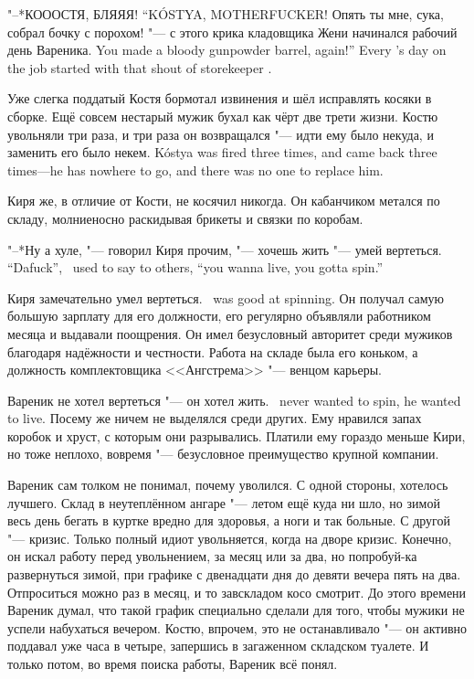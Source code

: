 {"--*КОООСТЯ, БЛЯЯЯ!}
{``K\'OSTYA, MOTHERFUCKER!}
{Опять ты мне, сука, собрал бочку с порохом! "--- с этого крика кладовщика Жени начинался рабочий день Вареника.}
{You made a bloody gunpowder barrel, again!'' Every \Varenik's day on the job started with that shout of storekeeper \Zhenya.}

Уже слегка поддатый Костя бормотал извинения и шёл исправлять косяки в сборке.
Ещё совсем нестарый мужик бухал как чёрт две трети жизни.
{Костю увольняли три раза, и три раза он возвращался "--- идти ему было некуда, и заменить его было некем.}
{K\'ostya was fired three times, and came back three times---he has nowhere to go, and there was no one to replace him.}

Киря же, в отличие от Кости, не косячил никогда.
Он кабанчиком метался по складу, молниеносно раскидывая брикеты и связки по коробам.

{"--*Ну а хуле, "--- говорил Киря прочим, "--- хочешь жить "--- умей вертеться.}
{``Dafuck'', \Kirya\ used to say to others, ``you wanna live, you gotta spin.''}

{Киря замечательно умел вертеться.}
{\Kirya\ was good at spinning.}
Он получал самую большую зарплату для его должности, его регулярно объявляли работником месяца и выдавали поощрения.
Он имел безусловный авторитет среди мужиков благодаря надёжности и честности.
Работа на складе была его коньком, а должность комплектовщика <<Ангстрема>> "--- венцом карьеры.

{Вареник не хотел вертеться "--- он хотел жить.}
{\Varenik\ never wanted to spin, he wanted to live.}
Посему же ничем не выделялся среди других.
Ему нравился запах коробок и хруст, с которым они разрывались.
Платили ему гораздо меньше Кири, но тоже неплохо, вовремя "--- безусловное преимущество крупной компании.

Вареник сам толком не понимал, почему уволился.
С одной стороны, хотелось лучшего.
Склад в неутеплённом ангаре "--- летом ещё куда ни шло, но зимой весь день бегать в куртке вредно для здоровья, а ноги и так больные.
С другой "--- кризис.
Только полный идиот увольняется, когда на дворе кризис.
Конечно, он искал работу перед увольнением, за месяц или за два, но попробуй-ка развернуться зимой, при графике с двенадцати дня до девяти вечера пять на два.
Отпроситься можно раз в месяц, и то завскладом косо смотрит.
До этого времени Вареник думал, что такой график специально сделали для того, чтобы мужики не успели набухаться вечером.
Костю, впрочем, это не останавливало "--- он активно поддавал уже часа в четыре, запершись в загаженном складском туалете.
И только потом, во время поиска работы, Вареник всё понял.

